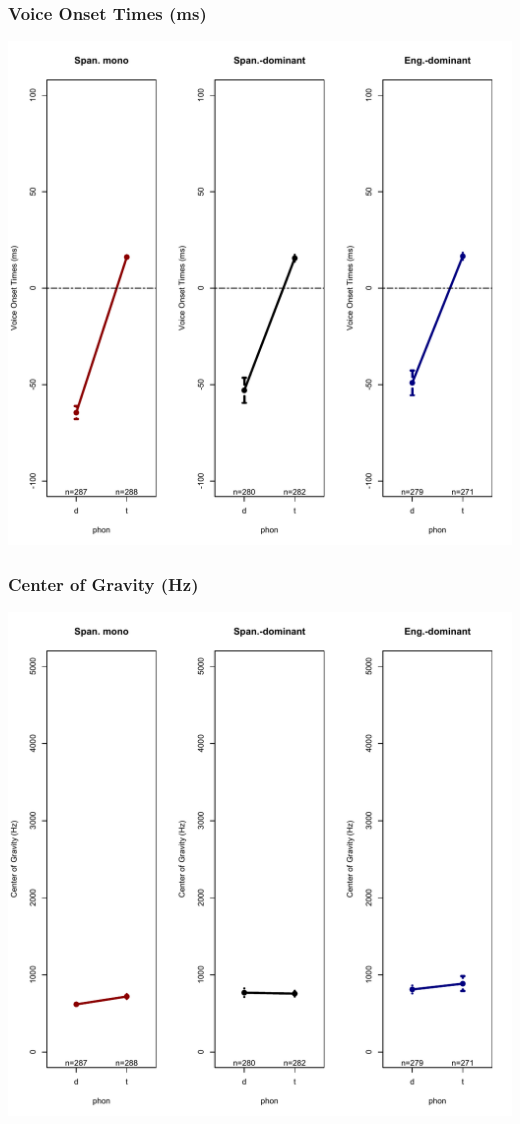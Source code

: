 \documentclass{beamer}
\begin{document}
\begin{frame}
\frametitle{Voice Onset Times (ms)}
\begin{center}
\includegraphics[scale=.375]{simplified/fig04_votspanish.pdf}
\end{center}
\end{frame}

\begin{frame}
\frametitle{Center of Gravity (Hz)}
\begin{center}
\includegraphics[scale=.375]{simplified/fig05_cogspanish.pdf}
\end{center}
\end{frame}
\end{document}
